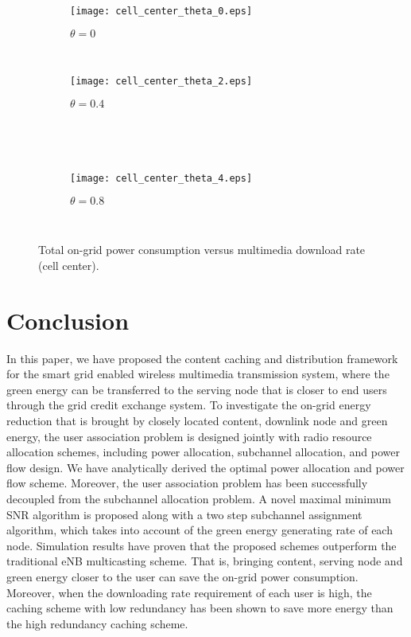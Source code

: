 \documentclass[journal,12pt,onecolumn]{IEEEtran}
\begin{document}
\begin{figure}
\vspace{-1em}
\centering   
                \begin{subfigure}[!t]{3 in}
                \texttt{[image: cell\_center\_theta\_0.eps]}\caption{$\theta=0$}
\end{subfigure}
        ~
        
        \begin{subfigure}[!t]{3 in}
                \texttt{[image: cell\_center\_theta\_2.eps]}\caption{$\theta=0.4$}
\end{subfigure}~
        
         ~\begin{subfigure}[!t]{3 in}
                \texttt{[image: cell\_center\_theta\_4.eps]}\caption{$\theta=0.8$}
\end{subfigure}
        ~ 

        \caption{Total on-grid power consumption versus multimedia download rate (cell center).}\label{result2}
\end{figure}

\section{Conclusion}
In this paper, we have proposed the content caching and distribution framework for the smart grid enabled wireless multimedia transmission system, where the green energy can be transferred to the serving node that is closer to end users through the grid credit exchange system. To investigate the on-grid energy reduction that is brought by closely located content, downlink node and green energy, the user association problem is designed jointly with radio resource allocation schemes, including power allocation, subchannel allocation, and power flow design. We have analytically derived the optimal power allocation and power flow scheme. Moreover, the user association problem has been successfully decoupled from the subchannel allocation problem. A novel maximal minimum SNR algorithm is proposed along with a two step subchannel assignment algorithm, which takes into account of the green energy generating rate of each node. Simulation results have proven that the proposed schemes outperform the traditional eNB multicasting scheme. That is, bringing content, serving node and green energy closer to the user can save the on-grid power consumption. Moreover, when the downloading rate requirement of each user is high, the caching scheme with low redundancy has been shown to save more energy than the high redundancy caching scheme.


\end{document}
